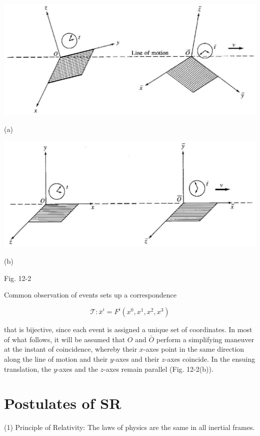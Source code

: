 \documentclass[10pt]{article}
\begin{document}
\begin{center}
\includegraphics[max width=\textwidth]{2024_04_03_41f90be4f896e21f0dc9g-175(1)}
\end{center}

(a)

\begin{center}
\includegraphics[max width=\textwidth]{2024_04_03_41f90be4f896e21f0dc9g-175}
\end{center}

(b)

Fig. 12-2

Common observation of events sets up a correspondence


\begin{equation*}
\mathscr{T}: \bar{x}^{i}=F^{i}\left(x^{0}, x^{1}, x^{2}, x^{3}\right) \tag{12.4}
\end{equation*}


that is bijective, since each event is assigned a unique set of coordinates. In most of what follows, it will be assumed that $O$ and $\bar{O}$ perform a simplifying maneuver at the instant of coincidence, whereby their $x$-axes point in the same direction along the line of motion and their $y$-axes and their $z$-axes coincide. In the ensuing translation, the $y$-axes and the $z$-axes remain parallel (Fig. 12-2(b)).

\section*{Postulates of SR}
(1) Principle of Relativity: The laws of physics are the same in all inertial frames.
\end{document}
